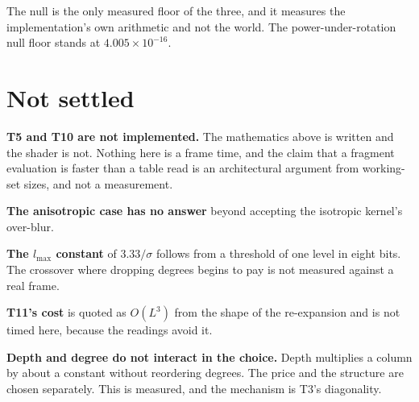 The null is the only measured floor of the three, and it measures the implementation's own arithmetic and not the world. The power-under-rotation null floor stands at \(4.005 \times 10^{-16}\).

\section{Not settled}

\textbf{T5 and T10 are not implemented.} The mathematics above is written and the shader is not. Nothing here is a frame time, and the claim that a fragment evaluation is faster than a table read is an architectural argument from working-set sizes, and not a measurement.

\textbf{The anisotropic case has no answer} beyond accepting the isotropic kernel's over-blur.

\textbf{The \(l_{\max}\) constant} of \(3.33/\sigma\) follows from a threshold of one level in eight bits. The crossover where dropping degrees begins to pay is not measured against a real frame.

\textbf{T11's cost} is quoted as \(O(L^3)\) from the shape of the re-expansion and is not timed here, because the readings avoid it.

\textbf{Depth and degree do not interact in the choice.} Depth multiplies a column by about a constant without reordering degrees. The price and the structure are chosen separately. This is measured, and the mechanism is T3's diagonality.
